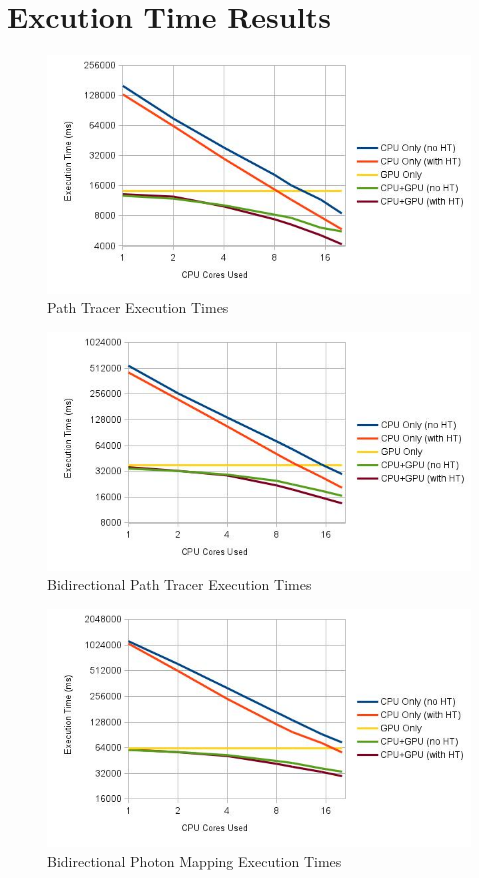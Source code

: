 \section{Excution Time Results}

\begin{figure}[H]
\includegraphics[width=\linewidth]{img/ptTexec.jpg}
\caption{\label{img:ptTexec} Path Tracer Execution Times}
\end{figure}

\begin{figure}[H]
\includegraphics[width=\linewidth]{img/bptTexec.jpg}
\caption{\label{img:bptTexec} Bidirectional Path Tracer Execution Times}
\end{figure}

\begin{figure}[H]
\includegraphics[width=\linewidth]{img/bpmTexec.jpg}
\caption{\label{img:bpmTexec} Bidirectional Photon Mapping Execution Times}
\end{figure}

